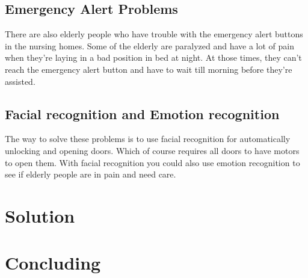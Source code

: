 \documentclass[14pt, a4paper]{extarticle}
\begin{document}
	\subsection{Emergency Alert Problems}
	There are also elderly people who have trouble with the emergency alert buttons in the nursing homes. Some of the elderly are paralyzed and have a lot of pain when they're laying in a bad position in bed at night. At those times, they can't reach the emergency alert button and have to wait till morning before they're assisted.
	
	\subsection{Facial recognition and Emotion recognition}
	The way to solve these problems is to use facial recognition for automatically unlocking and opening doors. Which of course requires all doors to have motors to open them. With facial recognition you could also use emotion recognition to see if elderly people are in pain and need care. 
	
	\newpage
	\section{Solution}
	
	
	\newpage
	\section{Concluding}
	
	\newpage
	
	
	
	
\end{document}
